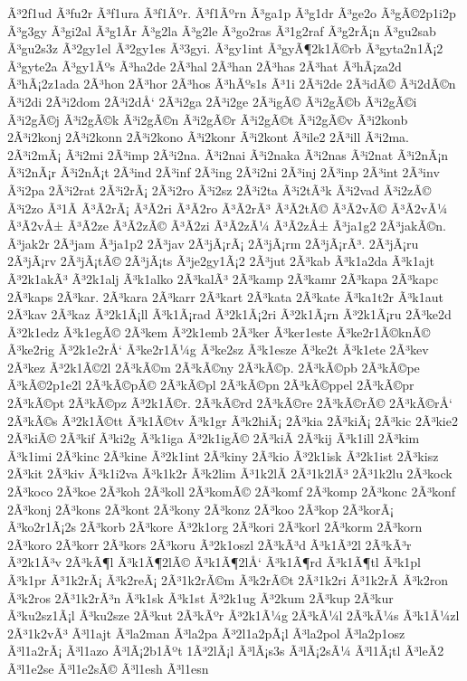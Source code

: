 {Ã³2f1ud
Ã³fu2r
Ã³f1ura
Ã³f1Ãºr.
Ã³f1Ãºrn
Ã³ga1p
Ã³g1dr
Ã³ge2o
Ã³gÃ©2p1i2p
Ã³g3gy
Ã³gi2al
Ã³g1Ã­r
Ã³g2la
Ã³g2le
Ã³go2ras
Ã³1g2raf
Ã³g2rÃ¡n
Ã³gu2sab
Ã³gu2s3z
Ã³2gy1el
Ã³2gy1es
Ã³3gyi.
Ã³gy1int
Ã³gyÃ¶2k1Ã©rb
Ã³gyta2n1Ã¡2
Ã³gyte2a
Ã³gy1Ãºs
Ã³ha2de
2Ã³hal
2Ã³han
2Ã³has
2Ã³hat
Ã³hÃ¡za2d
Ã³hÃ¡2z1ada
2Ã³hon
2Ã³hor
2Ã³hos
Ã³hÃºs1s
Ã³1i
2Ã³i2de
2Ã³idÃ©
Ã³i2dÃ©n
Ã³i2di
2Ã³i2dom
2Ã³i2dÅ‘
2Ã³i2ga
2Ã³i2ge
2Ã³igÃ©
Ã³i2gÃ©b
Ã³i2gÃ©i
Ã³i2gÃ©j
Ã³i2gÃ©k
Ã³i2gÃ©n
Ã³i2gÃ©r
Ã³i2gÃ©t
Ã³i2gÃ©v
Ã³i2konb
2Ã³i2konj
2Ã³i2konn
2Ã³i2kono
Ã³i2konr
Ã³i2kont
Ã³ile2
2Ã³ill
Ã³i2ma.
2Ã³i2mÃ¡
Ã³i2mi
2Ã³imp
2Ã³i2na.
Ã³i2nai
Ã³i2naka
Ã³i2nas
Ã³i2nat
Ã³i2nÃ¡n
Ã³i2nÃ¡r
Ã³i2nÃ¡t
2Ã³ind
2Ã³inf
2Ã³ing
2Ã³i2ni
2Ã³inj
2Ã³inp
2Ã³int
2Ã³inv
Ã³i2pa
2Ã³i2rat
2Ã³i2rÃ¡
2Ã³i2ro
Ã³i2sz
2Ã³i2ta
Ã³i2tÃ³k
Ã³i2vad
Ã³i2zÃ©
Ã³i2zo
Ã³1Ã­
Ã³Ã­2rÃ¡
Ã³Ã­2ri
Ã³Ã­2ro
Ã³Ã­2rÃ³
Ã³Ã­2tÃ©
Ã³Ã­2vÃ©
Ã³Ã­2vÃ¼
Ã³Ã­2vÅ±
Ã³Ã­2ze
Ã³Ã­2zÃ©
Ã³Ã­2zi
Ã³Ã­2zÃ¼
Ã³Ã­2zÅ±
Ã³ja1g2
2Ã³jakÃ©n.
Ã³jak2r
2Ã³jam
Ã³ja1p2
2Ã³jav
2Ã³jÃ¡rÃ¡
2Ã³jÃ¡rm
2Ã³jÃ¡rÃ³.
2Ã³jÃ¡ru
2Ã³jÃ¡rv
2Ã³jÃ¡tÃ©
2Ã³jÃ¡ts
Ã³je2gy1Ã¡2
2Ã³jut
2Ã³kab
Ã³k1a2da
Ã³k1ajt
Ã³2k1akÃ³
Ã³2k1alj
Ã³k1alko
2Ã³kalÃ³
2Ã³kamp
2Ã³kamr
2Ã³kapa
2Ã³kapc
2Ã³kaps
2Ã³kar.
2Ã³kara
2Ã³karr
2Ã³kart
2Ã³kata
2Ã³kate
Ã³ka1t2r
Ã³k1aut
2Ã³kav
2Ã³kaz
Ã³2k1Ã¡ll
Ã³k1Ã¡rad
Ã³2k1Ã¡2ri
Ã³2k1Ã¡rn
Ã³2k1Ã¡ru
2Ã³ke2d
Ã³2k1edz
Ã³k1egÃ©
2Ã³kem
Ã³2k1emb
2Ã³ker
Ã³ker1este
Ã³ke2r1Ã©knÃ©
Ã³ke2rig
Ã³2k1e2rÅ‘
Ã³ke2r1Ã¼g
Ã³ke2sz
Ã³k1esze
Ã³ke2t
Ã³k1ete
2Ã³kev
2Ã³kez
Ã³2k1Ã©2l
2Ã³kÃ©m
2Ã³kÃ©ny
2Ã³kÃ©p.
2Ã³kÃ©pb
2Ã³kÃ©pe
Ã³kÃ©2p1e2l
2Ã³kÃ©pÃ©
2Ã³kÃ©pl
2Ã³kÃ©pn
2Ã³kÃ©ppel
2Ã³kÃ©pr
2Ã³kÃ©pt
2Ã³kÃ©pz
Ã³2k1Ã©r.
2Ã³kÃ©rd
2Ã³kÃ©re
2Ã³kÃ©rÃ©
2Ã³kÃ©rÅ‘
2Ã³kÃ©s
Ã³2k1Ã©tt
Ã³k1Ã©tv
Ã³k1gr
Ã³k2hiÃ¡
2Ã³kia
2Ã³kiÃ¡
2Ã³kic
2Ã³kie2
2Ã³kiÃ©
2Ã³kif
Ã³ki2g
Ã³k1iga
Ã³2k1igÃ©
2Ã³kiÃ­
2Ã³kij
Ã³k1ill
2Ã³kim
Ã³k1imi
2Ã³kinc
2Ã³kine
Ã³2k1int
2Ã³kiny
2Ã³kio
Ã³2k1isk
Ã³2k1ist
2Ã³kisz
2Ã³kit
2Ã³kiv
Ã³k1i2va
Ã³k1k2r
Ã³k2lim
Ã³1k2lÃ­
2Ã³1k2lÃ³
2Ã³1k2lu
2Ã³kock
2Ã³koco
2Ã³koe
2Ã³koh
2Ã³koll
2Ã³komÃ©
2Ã³komf
2Ã³komp
2Ã³konc
2Ã³konf
2Ã³konj
2Ã³kons
2Ã³kont
2Ã³kony
2Ã³konz
2Ã³koo
2Ã³kop
2Ã³korÃ¡
Ã³ko2r1Ã¡2s
2Ã³korb
2Ã³kore
Ã³2k1org
2Ã³kori
2Ã³korl
2Ã³korm
2Ã³korn
2Ã³koro
2Ã³korr
2Ã³kors
2Ã³koru
Ã³2k1oszl
2Ã³kÃ³d
Ã³k1Ã³2l
2Ã³kÃ³r
Ã³2k1Ã³v
2Ã³kÃ¶l
Ã³k1Ã¶2lÃ©
Ã³k1Ã¶2lÅ‘
Ã³k1Ã¶rd
Ã³k1Ã¶tl
Ã³k1pl
Ã³k1pr
Ã³1k2rÃ¡
Ã³k2reÃ¡
2Ã³1k2rÃ©m
Ã³k2rÃ©t
2Ã³1k2ri
Ã³1k2rÃ­
Ã³k2ron
Ã³k2ros
2Ã³1k2rÃ³n
Ã³k1sk
Ã³k1st
Ã³2k1ug
Ã³2kum
2Ã³kup
2Ã³kur
Ã³ku2sz1Ã¡l
Ã³ku2sze
2Ã³kut
2Ã³kÃºr
Ã³2k1Ã¼g
2Ã³kÃ¼l
2Ã³kÃ¼s
Ã³k1Ã¼zl
2Ã³1k2vÃ³
Ã³l1ajt
Ã³la2man
Ã³la2pa
Ã³2l1a2pÃ¡l
Ã³la2pol
Ã³la2p1osz
Ã³l1a2rÃ¡
Ã³l1azo
Ã³lÃ¡2b1Ãºt
1Ã³2lÃ¡l
Ã³lÃ¡s3s
Ã³lÃ¡2sÃ¼
Ã³l1Ã¡tl
Ã³leÃ­2
Ã³l1e2se
Ã³l1e2sÃ©
Ã³l1esh
Ã³l1esn
}
